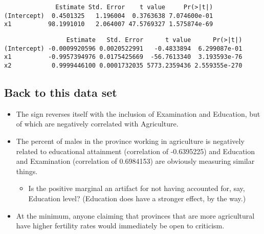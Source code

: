\documentclass[12pt,openright,oneside,a4paper,chapter=TITLE,section=TITLE,subsection=Title,english,french,spanish,portugues,sumario=tradicional]{04-class-files/abntex2}
\newenvironment{Shaded}{\begin{snugshade}}{\end{snugshade}}
\newcommand{\KeywordTok}[1]{\textcolor[rgb]{0.13,0.29,0.53}{\textbf{#1}}}
\newcommand{\NormalTok}[1]{#1}
\newcommand{\OperatorTok}[1]{\textcolor[rgb]{0.81,0.36,0.00}{\textbf{#1}}}
\newcommand{\StringTok}[1]{\textcolor[rgb]{0.31,0.60,0.02}{#1}}
\providecommand{\tightlist}{%
  \setlength{\itemsep}{0pt}\setlength{\parskip}{0pt}}
\begin{document}
\begin{verbatim}
              Estimate Std. Error    t value     Pr(>|t|)
(Intercept)  0.4501325   1.196004  0.3763638 7.074600e-01
x1          98.1991010   2.064007 47.5769327 1.575874e-69
\end{verbatim}

\begin{Shaded}
\end{Shaded}

\begin{verbatim}
                 Estimate   Std. Error      t value      Pr(>|t|)
(Intercept) -0.0009920596 0.0020522991   -0.4833894  6.299087e-01
x1          -0.9957394976 0.0175425669  -56.7613340  3.193593e-76
x2           0.9999446100 0.0001732035 5773.2359436 2.559355e-270
\end{verbatim}

\hypertarget{back-to-this-data-set}{%
\subsection{Back to this data set}\label{back-to-this-data-set}}

\begin{itemize}
\tightlist
\item
  The sign reverses itself with the inclusion of Examination and Education, but of which are negatively correlated with Agriculture.
\item
  The percent of males in the province working in agriculture is negatively related to educational attainment (correlation of -0.6395225) and Education and Examination (correlation of 0.6984153) are obviously measuring similar things.

  \begin{itemize}
  \tightlist
  \item
    Is the positive marginal an artifact for not having accounted for, say, Education level? (Education does have a stronger effect, by the way.)
  \end{itemize}
\item
  At the minimum, anyone claiming that provinces that are more agricultural have higher fertility rates would immediately be open to criticism.
\end{itemize}
\end{document}
